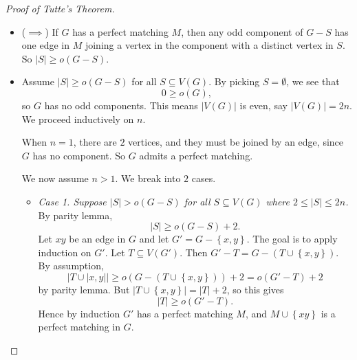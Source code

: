 \documentclass[co342]{subfiles}
\begin{document}
    \clearpage
    \begin{proof}[Proof of Tutte's Theorem]
        \begin{itemize}
            \item ($\implies$) If $G$ has a perfect matching $M$, then any odd component of $G-S$ has one edge in $M$ joining a vertex in the component with a distinct vertex in $S$. So $\left| S \right|\geq o\left( G-S \right)$.

            \item Assume $\left| S \right|\geq o\left( G-S \right)$ for all $S\subseteq V\left( G \right)$. By picking $S=\emptyset$, we see that
                \begin{equation*}
                    0\geq o\left( G \right),
                \end{equation*}
                so $G$ has no odd components. This means $\left| V\left( G \right) \right|$ is even, say $\left| V\left( G \right) \right|=2n$. We proceed inductively on $n$.

                When $n=1$, there are $2$ vertices, and they must be joined by an edge, since $G$ has no component. So $G$ admits a perfect matching.

                We now assume $n>1$. We break into $2$ cases.

                \begin{itemize}
                    \item \textit{Case 1. Suppose $\left| S \right|>o\left( G-S \right)$ for all $S\subseteq V\left( G \right)$ where $2\leq\left| S \right|\leq 2n$.} By parity lemma,
                        \begin{equation*}
                            \left| S \right|\geq o\left( G-S \right)+2.
                        \end{equation*}
                        Let $xy$ be an edge in $G$ and let $G'=G-\left\lbrace x,y \right\rbrace$. The goal is to apply induction on $G'$. Let $T\subseteq V\left( G' \right)$. Then $G'-T = G-\left( T\cup \left\lbrace x,y \right\rbrace \right)$. By assumption,
                        \begin{equation*}
                            \left| T\cup \left| x,y \right| \right| \geq o\left( G-\left( T\cup \left\lbrace x,y \right\rbrace \right) \right)+2 = o\left( G'-T \right)+2
                        \end{equation*}
                        by parity lemma. But $\left| T\cup \left\lbrace x,y \right\rbrace \right|=\left| T \right|+2$, so this gives
                        \begin{equation*}
                            \left| T \right|\geq o\left( G'-T \right).
                        \end{equation*}
                        Hence by induction $G'$ has a perfect matching $M$, and $M\cup \left\lbrace xy \right\rbrace$ is a perfect matching in $G$.


\end{itemize}
\end{itemize}
\end{proof}
\end{document}
